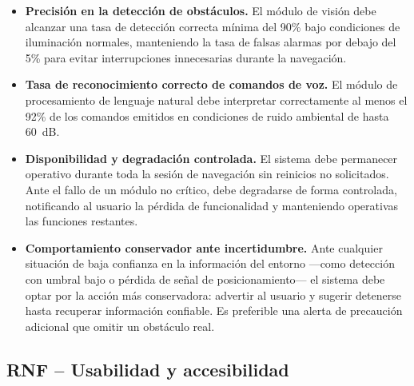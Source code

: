 \begin{itemize}

    \item[\textbf{RNF-06}] \textbf{Precisión en la detección de obstáculos.}
    El módulo de visión debe alcanzar una tasa de detección correcta mínima del 90\% bajo
    condiciones de iluminación normales, manteniendo la tasa de falsas alarmas por debajo
    del 5\% para evitar interrupciones innecesarias durante la navegación.

    \item[\textbf{RNF-07}] \textbf{Tasa de reconocimiento correcto de comandos de voz.}
    El módulo de procesamiento de lenguaje natural debe interpretar correctamente al menos
    el 92\% de los comandos emitidos en condiciones de ruido ambiental de hasta 60~dB.

    \item[\textbf{RNF-08}] \textbf{Disponibilidad y degradación controlada.}
    El sistema debe permanecer operativo durante toda la sesión de navegación sin reinicios
    no solicitados. Ante el fallo de un módulo no crítico, debe degradarse de forma
    controlada, notificando al usuario la pérdida de funcionalidad y manteniendo operativas
    las funciones restantes.

    \item[\textbf{RNF-09}] \textbf{Comportamiento conservador ante incertidumbre.}
    Ante cualquier situación de baja confianza en la información del entorno ---como
    detección con umbral bajo o pérdida de señal de posicionamiento--- el sistema debe
    optar por la acción más conservadora: advertir al usuario y sugerir detenerse hasta
    recuperar información confiable. Es preferible una alerta de precaución adicional que
    omitir un obstáculo real.

\end{itemize}

\subsection*{RNF -- Usabilidad y accesibilidad}

